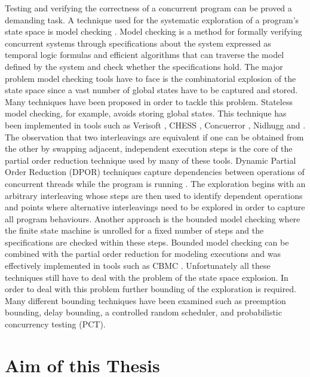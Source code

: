 Testing and verifying the correctness of a concurrent program can be proved a demanding task. 
A technique used for the systematic exploration of a program's state space is model checking \cite{WikipediaModelChecking}.
Model checking is a method for formally verifying concurrent systems through specifications about the system expressed as 
temporal logic formulas and efficient algorithms that can traverse the model defined by the system and check whether
the specifications hold. The major problem model checking tools have to face is the combinatorial explosion of the state space since
a vast number of global states have to be captured and stored. Many techniques have been proposed in order to tackle this problem.
Stateless model checking, for example, avoids storing global states. This technique has been implemented in tools such as Verisoft \cite{SMC,Gode05}, 
CHESS \cite{Musu08}, Concuerror \cite{Chri13}, Nidhugg \cite{AbdullaAronisAtigJonssonLeonardssonSagonasSMC2015} and \cite{RCMC}. The observation that two 
interleavings are equivalent if one can be obtained from the other by swapping adjacent, independent execution steps is the core of the partial
order reduction \cite{Valmari1991, Peled1993, Godefroid1996,POR,JACM} technique used by many of these tools. Dynamic Partial Order Reduction (DPOR) techniques
capture dependencies between operations of concurrent threads while the program is running \cite{FlanaganDPOR}. The exploration begins with an arbitrary interleaving whose steps are then
used to identify dependent operations and points where alternative interleavings need to
be explored in order to capture all program behaviours. Another approach is the bounded model checking \cite{BoundedModelChecking} where the finite state
machine is unrolled for a fixed number of steps and the specifications are checked within these steps. Bounded model checking can be combined with the partial
order reduction for modeling executions \cite{PORinBMC} and was effectively implemented in tools such as CBMC \cite{CBMC}.
Unfortunately all these techniques still have to deal with the problem of the state space explosion. In order to deal with this problem further
bounding of the exploration is required. Many different bounding techniques have been examined \cite{Thomson} such as preemption bounding, delay
bounding, a controlled random scheduler, and probabilistic concurrency testing (PCT).

\section{Aim of this Thesis}


